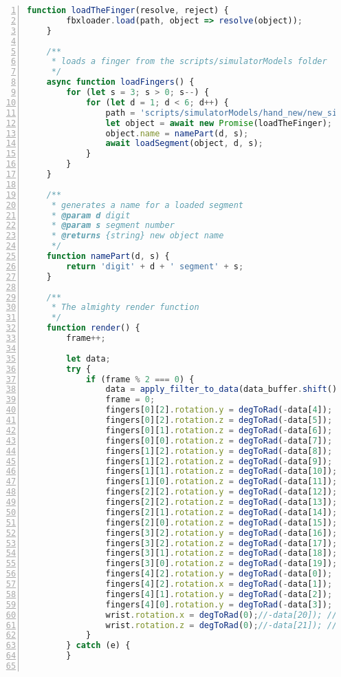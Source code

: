 \documentclass[paper=a4,12pt]{scrreprt}
\begin{document}
\begin{lstlisting}[caption={Emulator-Sourcecode}, captionpos=b, label={listing:emu_source},language=javascript, numbers=left,
  stepnumber=1]
    function loadTheFinger(resolve, reject) {
        fbxloader.load(path, object => resolve(object));
    }

    /**
     * loads a finger from the scripts/simulatorModels folder
     */
    async function loadFingers() {
        for (let s = 3; s > 0; s--) {
            for (let d = 1; d < 6; d++) {
                path = 'scripts/simulatorModels/hand_new/new_simHand_id' + d + '' + s + '.fbx';
                let object = await new Promise(loadTheFinger);
                object.name = namePart(d, s);
                await loadSegment(object, d, s);
            }
        }
    }

    /**
     * generates a name for a loaded segment
     * @param d digit
     * @param s segment number
     * @returns {string} new object name
     */
    function namePart(d, s) {
        return 'digit' + d + ' segment' + s;
    }

    /**
     * The almighty render function
     */
    function render() {
        frame++;

        let data;
        try {
            if (frame % 2 === 0) {
                data = apply_filter_to_data(data_buffer.shift());
                frame = 0;
                fingers[0][2].rotation.y = degToRad(-data[4]); // if_base_rot
                fingers[0][2].rotation.z = degToRad(-data[5]); // if_base
                fingers[0][1].rotation.z = degToRad(-data[6]); // if_middle
                fingers[0][0].rotation.z = degToRad(-data[7]); // if_tip
                fingers[1][2].rotation.y = degToRad(-data[8]); // mf_base_rot
                fingers[1][2].rotation.z = degToRad(-data[9]); // mf_base
                fingers[1][1].rotation.z = degToRad(-data[10]); // mf_middle
                fingers[1][0].rotation.z = degToRad(-data[11]); // mf_tip
                fingers[2][2].rotation.y = degToRad(-data[12]); // rf_base_rot
                fingers[2][2].rotation.z = degToRad(-data[13]); // rf_base
                fingers[2][1].rotation.z = degToRad(-data[14]); // rf_middle
                fingers[2][0].rotation.z = degToRad(-data[15]); // rf_tip
                fingers[3][2].rotation.y = degToRad(-data[16]); // p_base_rot
                fingers[3][2].rotation.z = degToRad(-data[17]); // p_base
                fingers[3][1].rotation.z = degToRad(-data[18]); // p_middle
                fingers[3][0].rotation.z = degToRad(-data[19]); // p_tip
                fingers[4][2].rotation.y = degToRad(-data[0]); // th_rot_orthogonal
                fingers[4][2].rotation.x = degToRad(-data[1]); // th_rot_palm
                fingers[4][1].rotation.y = degToRad(-data[2]); // th_base
                fingers[4][0].rotation.y = degToRad(-data[3]); // th_tip
                wrist.rotation.x = degToRad(0);//-data[20]); // wr_lr
                wrist.rotation.z = degToRad(0);//-data[21]); // wr_bf
            }
        } catch (e) {
        }


\end{lstlisting}
\end{document}
